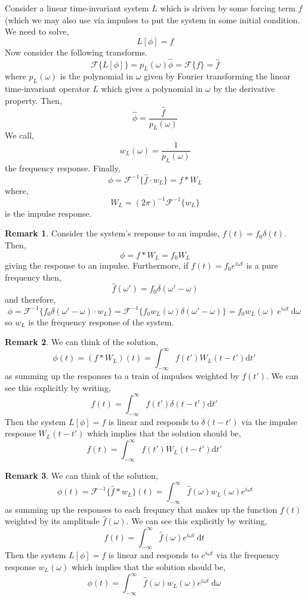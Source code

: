 \documentclass[12pt]{extarticle}
\renewcommand{\d}[1]{ \mathrm{d}#1 \:}
\theoremstyle{definition}
\newtheorem{remark}{Remark}
\newcommand{\F}{\mathcal{F}}
\begin{document}
Consider a linear time-invariant system $L$ which is driven by some forcing term $f$ (which we may also use via impulses to put the system in some initial condition. We need to solve,
\[ L[\phi] = f \]
Now consider the following transforms. 
\[ \F \{L[\phi] \} = p_L(\omega) \hat{\phi} = \F \{ f \} = \hat{f} \]
where $p_L(\omega)$ is the polynomial in $\omega$ given by Fourier transforming the linear time-invariant operator $L$ which gives a polynomial in $\omega$ by the derivative property.
Then,
\[ \hat{\phi} = \frac{\hat{f}}{p_L(\omega)} \]
We call,
\[ w_L(\omega) = \frac{1}{p_L(\omega)} \]
the frequency response.
Finally,
\[ \phi = \F^{-1} \{ \hat{f} \cdot w_L \} = f * W_L \]
where,
\[ W_L = (2 \pi)^{-1} \F^{-1} \{ w_L \} \]
is the impulse response. 

\begin{remark}
Consider the system's response to an impulse, $f(t) = f_0 \delta(t)$. Then,
\[ \phi = f * W_L = f_0 W_L \] 
giving the response to an impulse. Furthermore, if $f(t) = f_0 e^{i \omega t}$ is a pure frequency then,
\[ \hat{f}(\omega') = f_0 \delta(\omega' - \omega) \]
and therefore,
\[ \phi = \F^{-1} \{ f_0 \delta(\omega' - \omega) \cdot w_L \} = \F^{-1} \{ f_0 w_L(\omega) \delta(\omega' - \omega) \} = f_0 w_L(\omega) \: e^{i \omega t} \: \d{\omega} \]
so $w_L$ is the frequency response of the system. 
\end{remark}

\begin{remark}
We can think of the solution,
\[ \phi(t) = (f * W_L)(t) = \int_{-\infty}^{\infty} f(t') W_L(t - t') \d{t'} \]
as summing up the responses to a train of impulses weighted by $f(t')$. We can see this explicitly by writing,
\[ f(t) = \int_{-\infty}^{\infty} f(t') \delta(t - t') \d{t'} \]
Then the system $L[\phi] = f$ is linear and responds to $\delta(t - t')$ via the impulse response $W_L(t - t')$ which implies that the solution should be,
\[ f(t) = \int_{-\infty}^{\infty} f(t') W_L(t - t') \d{t'} \]
\end{remark}

\begin{remark}
We can think of the solution,
\[ \phi(t) = \F^{-1} \{ \hat{f} * w_L \}(t) = \int_{-\infty}^{\infty} \hat{f}(\omega) w_L(\omega) e^{i \omega t} \]
as summing up the responses to each frequncy that makes up the function $f(t)$ weighted by its amplitude $\hat{f}(\omega)$. We can see this explicitly by writing,
\[ f(t) = \int_{-\infty}^{\infty} \hat{f}(\omega) e^{i \omega t} \: \d{t} \]
Then the system $L[\phi] = f$ is linear and responds to $e^{i \omega t}$ via the frequency response $w_L(\omega)$ which implies that the solution should be,
\[ \phi(t) = \int_{-\infty}^{\infty} \hat{f}(\omega) w_L(\omega) e^{i \omega t} \: \d{\omega} \]
\end{remark}
\end{document}
